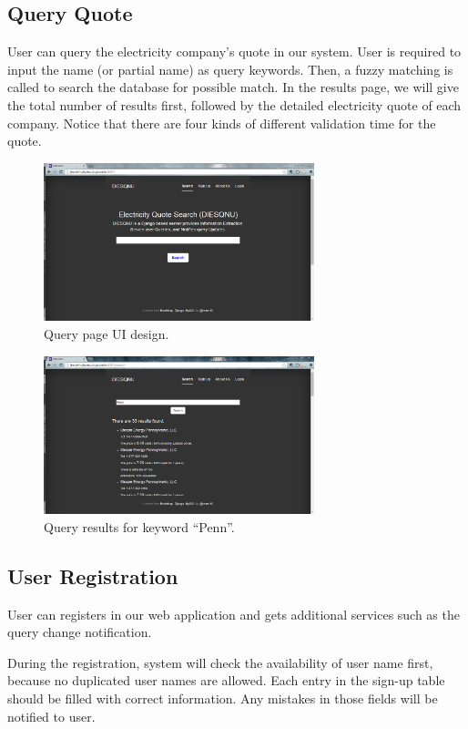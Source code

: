 \documentclass{article}
\begin{document}
\subsection{Query Quote}
User can query the electricity company's quote in our system. User is required to input the name (or partial name) as query keywords. Then, a fuzzy matching is called to search the database for possible match. In the results page, we will give the total number of results first, followed by the detailed electricity quote of each company. Notice that there are four kinds of different validation time for the quote.
\begin{figure}[h]
\centering
\includegraphics[width=0.7\textwidth]{fig/query.png}
\caption{Query page UI design.}
\end{figure}

\begin{figure}[h]
\centering
\includegraphics[width=0.7\textwidth]{fig/query-res.png}
\caption{Query results for keyword ``Penn''.}
\end{figure}


\subsection{User Registration}
User can registers in our web application and gets additional services such as the query change notification.

During the registration, system will check the availability of user name first, because no duplicated user names are allowed. Each entry in the sign-up table should be filled with correct information. Any mistakes in those fields will be notified to user.
\end{document}
